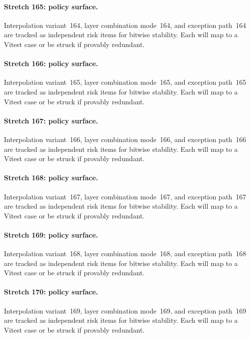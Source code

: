 \documentclass[sigconf,nonacm]{acmart}
\begin{document}
\paragraph{Stretch 165: policy surface.}
Interpolation variant~164, layer combination mode~164, and exception path~164 are tracked as independent risk items for bitwise stability. Each will map to a Vitest case or be struck if provably redundant. %

\paragraph{Stretch 166: policy surface.}
Interpolation variant~165, layer combination mode~165, and exception path~165 are tracked as independent risk items for bitwise stability. Each will map to a Vitest case or be struck if provably redundant. %

\paragraph{Stretch 167: policy surface.}
Interpolation variant~166, layer combination mode~166, and exception path~166 are tracked as independent risk items for bitwise stability. Each will map to a Vitest case or be struck if provably redundant. %

\paragraph{Stretch 168: policy surface.}
Interpolation variant~167, layer combination mode~167, and exception path~167 are tracked as independent risk items for bitwise stability. Each will map to a Vitest case or be struck if provably redundant. %

\paragraph{Stretch 169: policy surface.}
Interpolation variant~168, layer combination mode~168, and exception path~168 are tracked as independent risk items for bitwise stability. Each will map to a Vitest case or be struck if provably redundant. %

\paragraph{Stretch 170: policy surface.}
Interpolation variant~169, layer combination mode~169, and exception path~169 are tracked as independent risk items for bitwise stability. Each will map to a Vitest case or be struck if provably redundant. %
\end{document}
